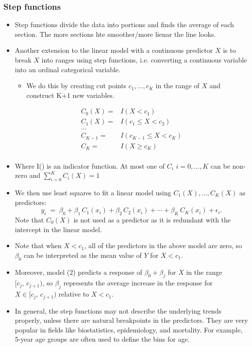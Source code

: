 \documentclass{article}
\begin{document}
\subsubsection{Step functions}
\begin{itemize}
    \item Step functions divide the data into portions and finds the average of each section. The more sections hte smoother/more lienar the line looks.
    \item Another extension to the linear model with a continuous predictor $X$ is to break $X$ into ranges using step functions, i.e. converting a continuous variable into an ordinal categorical variable.
    \begin{itemize}
        \item We do this by creating cut points $c_1, ..., c_K$ in the range of $X$ and  construct K+1 new variables.
    \end{itemize}
    \begin{align*}
        C_0(X) =& I(X < c_1)\\
        C_1(X) =& I(c_1 \leq X < c_2)\\
        ...&\\
        C_{K-1} =& I(c_{K-1} \leq X < c_K)\\
        C_K =& I(X \geq c_K)\\
    \end{align*}
    \item Where I() is an indicator function. At most one of $C_i$ $i = 0,...,K$ can be non-zero and $\sum_{i=0}^K C_i(X) = 1$
  \item We then use least squares to fit a linear model using $C_1(X), \dots, C_K(X)$ as predictors:
    \[
      y_i \;=\; \beta_0 + \beta_1\,C_1(x_i) + \beta_2\,C_2(x_i) + \cdots + \beta_K\,C_K(x_i) + \epsilon_i.
    \]
    Note that $C_0(X)$ is not used as a predictor as it is redundant with the intercept in the linear model.
  \item Note that when $X < c_1$, all of the predictors in the above model are zero, so $\beta_0$ can be interpreted as the mean value of $Y$ for $X < c_1$.
  \item Moreover, model (2) predicts a response of $\beta_0 + \beta_j$ for $X$ in the range $[c_j,\,c_{j+1})$, so $\beta_j$ represents the average increase in the response for $X\in[c_j,\,c_{j+1})$ relative to $X<c_1$.
  \item In general, the step functions may not describe the underlying trends properly, unless there are natural breakpoints in the predictors. They are very popular in fields like biostatistics, epidemiology, and mortality. For example, 5-year age groups are often used to define the bins for age.
\end{itemize}
\end{document}
